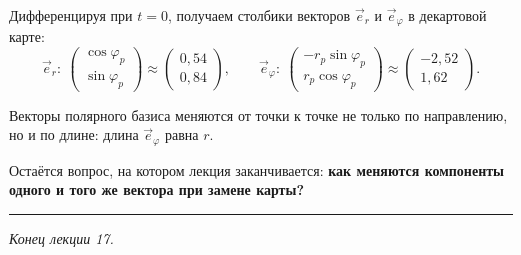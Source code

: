 \documentclass[11pt,a4paper]{article}
\begin{document}
Дифференцируя при $t = 0$, получаем столбики векторов $\vec e_r$ и $\vec e_\varphi$ в декартовой карте:
\[
\vec e_r:\ \begin{pmatrix} \cos\varphi_p \\ \sin\varphi_p \end{pmatrix} \approx \begin{pmatrix} 0{,}54 \\ 0{,}84 \end{pmatrix}, \qquad
\vec e_\varphi:\ \begin{pmatrix} -r_p\sin\varphi_p \\ r_p\cos\varphi_p \end{pmatrix} \approx \begin{pmatrix} -2{,}52 \\ 1{,}62 \end{pmatrix}.
\]

Векторы полярного базиса меняются от точки к точке не только по направлению, но и по длине: длина $\vec e_\varphi$ равна $r$.

Остаётся вопрос, на котором лекция заканчивается: \textbf{как меняются компоненты одного и того же вектора при замене карты?}

\par\bigskip\noindent\rule{\textwidth}{0.4pt}\par\noindent \emph{Конец лекции 17.}
\end{document}
